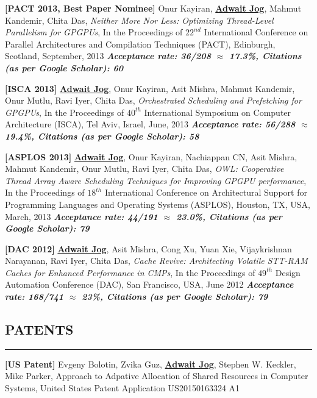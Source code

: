 \documentclass[10pt,a4]{article}
\begin{document}
\begin{description}
\item{\bf [PACT 2013, Best Paper Nominee]}
Onur Kayiran, {\bf \underline{Adwait Jog}}, Mahmut Kandemir, Chita Das,
{\it Neither More Nor Less: Optimizing Thread-Level Parallelism for GPGPUs},
In the Proceedings of $22^{nd}$ International Conference on Parallel Architectures and Compilation Techniques (PACT), 
Edinburgh, Scotland, September, 2013 
\textbf{\textit{Acceptance rate: 36/208 $\approx$ 17.3\%, Citations (as per Google Scholar): 60}}

\item{\bf [ISCA 2013]}
{\bf \underline{Adwait Jog}}, Onur Kayiran, Asit Mishra, Mahmut Kandemir, Onur Mutlu, Ravi Iyer, Chita Das, 
{\it Orchestrated Scheduling and Prefetching for GPGPUs}, 
In the Proceedings of $40^{th}$ International Symposium on Computer Architecture (ISCA), Tel Aviv, Israel, June, 2013
\textbf{\textit{Acceptance rate: 56/288 $\approx$ 19.4\%, Citations (as per Google Scholar): 58}}

\item{\bf [ASPLOS 2013]} 
{\bf \underline{Adwait Jog}}, Onur Kayiran, Nachiappan CN, Asit Mishra, Mahmut Kandemir, Onur Mutlu, Ravi Iyer, Chita Das, 
{\it OWL: Cooperative Thread Array Aware Scheduling Techniques for Improving GPGPU performance},
In the Proceedings of $18^{th}$ International Conference on Architectural Support for Programming Languages and Operating Systems (ASPLOS), Houston, TX, USA, March, 2013 
\textbf{\textit{Acceptance rate: 44/191 $\approx$ 23.0\%, Citations (as per Google Scholar): 79}}

\item{\bf [DAC 2012]}
{\bf \underline{Adwait Jog}}, Asit Mishra, Cong Xu, Yuan Xie, Vijaykrishnan Narayanan, 
Ravi Iyer, Chita Das, {\it Cache Revive: Architecting Volatile STT-RAM Caches for Enhanced 
Performance in CMPs}, 
In the Proceedings of $49^{th}$ Design Automation Conference (DAC), San Francisco, USA, June 2012
\textbf{\textit{Acceptance rate: 168/741 $\approx$ 23\%, Citations (as per Google Scholar): 79}}

\end{description}

\subsection*{PATENTS}
\hrule
\vspace{0.2cm}

\begin{description}
\item{\bf [US Patent]}
Evgeny Bolotin, Zvika Guz, {\bf \underline{Adwait Jog}}, Stephen W. Keckler, Mike Parker, 
Approach to Adpative Allocation of Shared Resources in Computer Systems, 
United States Patent Application US20150163324 A1 

\end{description}
\end{document}
